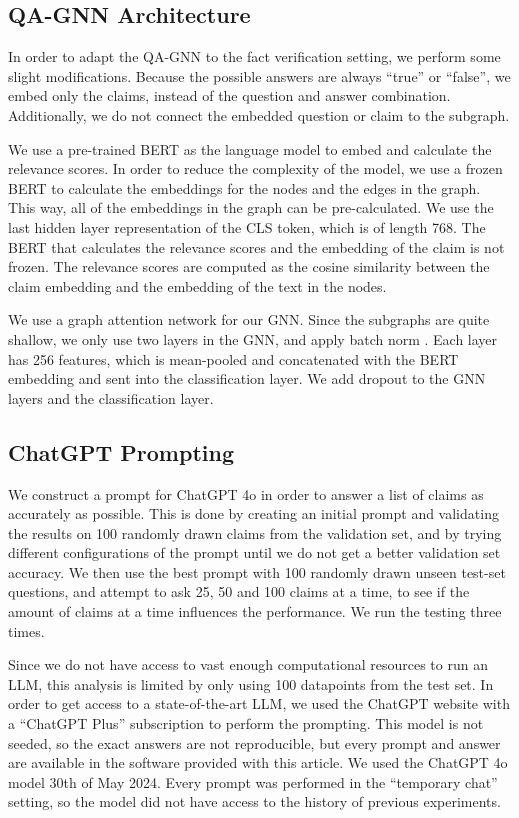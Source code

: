 \documentclass[11pt]{article}
\begin{document}
\subsection{QA-GNN Architecture}

In order to adapt the QA-GNN to the fact verification setting, we perform some slight modifications. Because the possible answers are always ``true'' or ``false'', we embed only the claims, instead of the question and answer combination. Additionally, we do not connect the embedded question or claim to the subgraph.

We use a pre-trained BERT \citep{devlin2018bert} as the language model to embed and calculate the relevance scores. In order to reduce the complexity of the model, we use a frozen BERT to calculate the embeddings for the nodes and the edges in the graph. This way, all of the embeddings in the graph can be pre-calculated. We use the last hidden layer representation of the CLS token, which is of length 768. The BERT that calculates the relevance scores and the embedding of the claim is not frozen. The relevance scores are computed as the cosine similarity between the claim embedding and the embedding of the text in the nodes.

We use a graph attention network \citep{velivckovic2017graph_attention} for our GNN. Since the subgraphs are quite shallow, we only use two layers in the GNN, and apply batch norm \citep{ioffe2015batch_norm}. Each layer has 256 features, which is mean-pooled and concatenated with the BERT embedding and sent into the classification layer. We add dropout \citep{srivastava2014dropout} to the GNN layers and the classification layer.

\subsection{ChatGPT Prompting}

We construct a prompt for ChatGPT 4o in order to answer a list of claims as accurately as possible. This is done by creating an initial prompt and validating the results on 100 randomly drawn claims from the validation set, and by trying different configurations of the prompt until we do not get a better validation set accuracy. We then use the best prompt with 100 randomly drawn unseen test-set questions, and attempt to ask 25, 50 and 100 claims at a time, to see if the amount of claims at a time influences the performance. We run the testing three times.

Since we do not have access to vast enough computational resources to run an LLM, this analysis is limited by only using 100 datapoints from the test set. In order to get access to a state-of-the-art LLM, we used the ChatGPT website with a ``ChatGPT Plus'' subscription to perform the prompting. This model is not seeded, so the exact answers are not reproducible, but every prompt and answer are available in the software provided with this article. We used the ChatGPT 4o model 30th of May 2024. Every prompt was performed in the ``temporary chat'' setting, so the model did not have access to the history of previous experiments.
\end{document}
